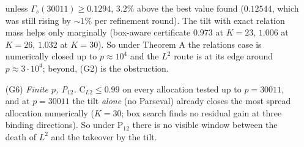 \begin{enumerate}
unless $\Gamma_s(30011)\ge0.1294$, $3.2\%$ above the best value found ($0.12544$, which was still rising by $\sim1\%$ per refinement round).  The tilt
with exact relation mass helps only marginally (box-aware certificate $0.973$ at $K=23$, $1.006$ at $K=26$, $1.032$ at $K=30$).  So under Theorem A the
relations case is numerically closed up to $p\approx10^4$ and the $L^2$ route is at its edge around $p\approx3\cdot10^4$; beyond, (G2) is the obstruction.
\item[(G6)] \emph{Finite $p$, P$_{12}$.}  $\mathrm C_{L2}\le0.99$ on every allocation tested up to $p=30011$, and at $p=30011$ the tilt \emph{alone}
(no Parseval) already closes the most spread allocation numerically ($K=30$; box search finds no residual gain at three binding directions).  So under P$_{12}$ there is no
visible window between the death of $L^2$ and the takeover by the tilt.
\end{enumerate}
